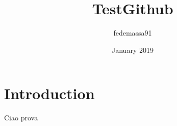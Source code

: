 \documentclass{article}
\title{TestGithub}
\author{fedemassa91 }
\date{January 2019}
\begin{document}
\maketitle

\section{Introduction}

Ciao prova
\end{document}

